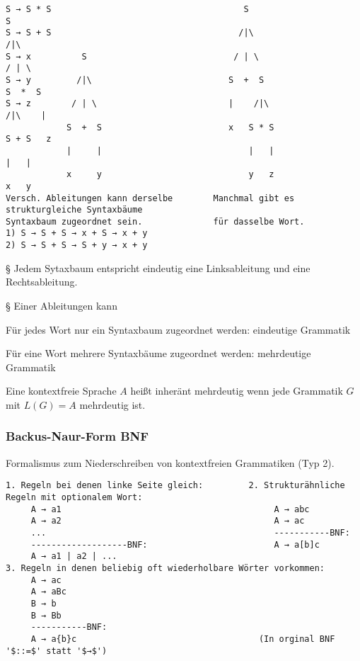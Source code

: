 \documentclass[11pt,
			a4paper,
			parskip=full,
			toc=bib,
			toc=idx,
			toc=listof,
			ngerman
			listof=totoc,]{scrartcl}
\newenvironment{cmt}%
{\color{mygray} § }
{\color{black}}
\newenvironment{expl}%
{\color{red}}
{\color{black}}
\newcommand{\compress}{\vspace{-1em}}
\begin{document}
\compress
\compress
\compress
\begin{expl}
\begin{verbatim}
S → S * S                                      S                             S   
S → S + S                                     /|\                           /|\
S → x          S                             / | \                         / | \
S → y         /|\                           S  +  S                       S  *  S
S → z        / | \                          |    /|\                     /|\    |
            S  +  S                         x   S * S                   S + S   z
            |     |                             |   |                   |   |
            x     y                             y   z                   x   y
Versch. Ableitungen kann derselbe        Manchmal gibt es strukturgleiche Syntaxbäume 
Syntaxbaum zugeordnet sein.              für dasselbe Wort.
1) S → S + S → x + S → x + y
2) S → S + S → S + y → x + y
\end{verbatim}
\end{expl}

\compress
\compress
\begin{cmt}
Jedem Sytaxbaum entspricht eindeutig eine Linksableitung und eine Rechtsableitung.
\end{cmt}

\compress
\begin{cmt}
Einer Ableitungen kann
\begin{compactitem}
\compress
  \item Für jedes Wort nur ein Syntaxbaum zugeordnet werden: eindeutige Grammatik
  \item Für eine Wort mehrere Syntaxbäume zugeordnet werden: mehrdeutige Grammatik
\end{compactitem}
\compress
Eine kontextfreie Sprache $A$ heißt inheränt mehrdeutig wenn jede Grammatik $G$
mit $L(G) = A$ mehrdeutig ist.
\end{cmt}


\compress
\subsubsection{Backus-Naur-Form BNF}
\compress
Formalismus zum Niederschreiben von kontextfreien Grammatiken (Typ 2).
\compress
\compress
\begin{verbatim}
1. Regeln bei denen linke Seite gleich:         2. Strukturähnliche Regeln mit optionalem Wort:
     A → a1                                          A → abc
     A → a2                                          A → ac
     ...                                             -----------BNF:
     -------------------BNF:                         A → a[b]c
     A → a1 | a2 | ...
3. Regeln in denen beliebig oft wiederholbare Wörter vorkommen:
     A → ac
     A → aBc
     B → b
     B → Bb
     -----------BNF:
     A → a{b}c                                    (In orginal BNF '$::=$' statt '$→$')     
\end{verbatim}
\end{document}
